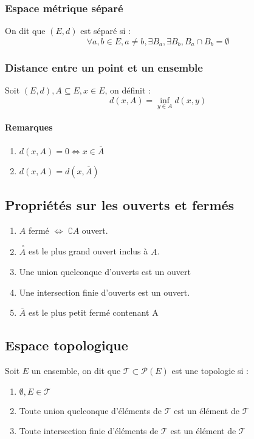 \documentclass[a4paper,10pt]{article}
\newcommand{\overcircle}[1]{\stackrel{\ \circ}{#1}}
\begin{document}
  \subsubsection{Espace m\'etrique s\'epar\'e}
   On dit que $(E,d)$ est s\'epar\'e si :
   $$\forall a, b \in E, a \ne b, \exists B_a, \exists B_b, B_a \cap B_b = \emptyset$$

  \subsubsection{Distance entre un point et un ensemble}
   Soit $(E,d), A \subseteq E, x \in E$, on d\'efinit : 
   $$d(x,A)= \inf_{y\in A} d(x,y)$$
   \paragraph{Remarques}
    \begin{enumerate}
      \item $d(x,A)=0 \iff x \in \overline{A}$
      \item $d(x,A)=d(x,\overline{A})$
    \end{enumerate}

 \subsection{Propri\'et\'es sur les ouverts et ferm\'es}
  \begin{enumerate}
    \item $A$ ferm\'e $\iff$ $\complement A$ ouvert.
    \item $\overcircle{A}$ est le plus grand ouvert inclus \`a $A$.
    \item Une union quelconque d'ouverts est un ouvert
    \item Une intersection finie d'ouverts est un ouvert.
    \item $\overline{A}$ est le plus petit ferm\'e contenant A
  \end{enumerate}

 \subsection{Espace topologique}
   Soit $E$ un ensemble, on dit que $\mathcal{T} \subset \mathcal{P} (E)$ est une topologie si : 
   \begin{enumerate}
     \item $\emptyset, E \in \mathcal{T}$
     \item Toute union quelconque d'\'el\'ements de $\mathcal{T}$ est un \'el\'ement de $\mathcal{T}$
     \item Toute intersection finie d'\'el\'ements de $\mathcal{T}$ est un \'el\'ement de $\mathcal{T}$
   \end{enumerate}
\end{document}
